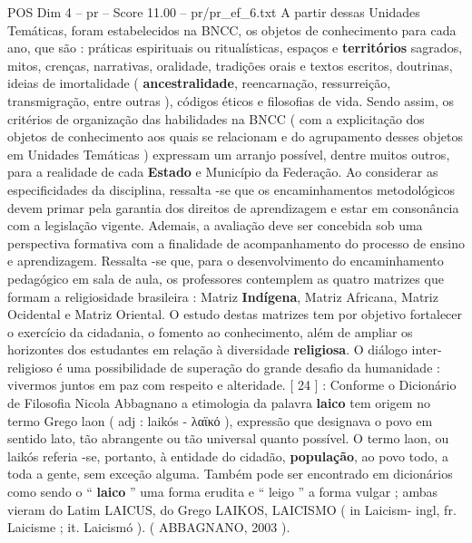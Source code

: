 \begin{textsample}{POS Dim 4 – pr – Score 11.00 – pr/pr\_ef\_6.txt}
A partir dessas Unidades Temáticas, foram estabelecidos na BNCC, os objetos de conhecimento para cada ano, que são : práticas espirituais ou ritualísticas, espaços e \textbf{territórios} sagrados, mitos, crenças, narrativas, oralidade, tradições orais e textos escritos, doutrinas, ideias de imortalidade ( \textbf{ancestralidade}, reencarnação, ressurreição, transmigração, entre outras ), códigos éticos e filosofias de vida.
Sendo assim, os critérios de organização das habilidades na BNCC ( com a explicitação dos objetos de conhecimento aos quais se relacionam e do agrupamento desses objetos em Unidades Temáticas ) expressam um arranjo possível, dentre muitos outros, para a realidade de cada \textbf{Estado} e Município da Federação.
Ao considerar as especificidades da disciplina, ressalta -se que os encaminhamentos metodológicos devem primar pela garantia dos direitos de aprendizagem e estar em consonância com a legislação vigente.
Ademais, a avaliação deve ser concebida sob uma perspectiva formativa com a finalidade de acompanhamento do processo de ensino e aprendizagem.
Ressalta -se que, para o desenvolvimento do encaminhamento pedagógico em sala de aula, os professores contemplem as quatro matrizes que formam a religiosidade brasileira : Matriz \textbf{Indígena}, Matriz Africana, Matriz Ocidental e Matriz Oriental.
O estudo destas matrizes tem por objetivo fortalecer o exercício da cidadania, o fomento ao conhecimento, além de ampliar os horizontes dos estudantes em relação à diversidade \textbf{religiosa}.
O diálogo inter-religioso é uma possibilidade de superação do grande desafio da humanidade : vivermos juntos em paz com respeito e alteridade. [ 24 ] : Conforme o Dicionário de Filosofia Nicola Abbagnano a etimologia da palavra \textbf{laico} tem origem no termo Grego laon ( adj : laikós - λαϊκό ), expressão que designava o povo em sentido lato, tão abrangente ou tão universal quanto possível.
O termo laon, ou laikós referia -se, portanto, à entidade do cidadão, \textbf{população}, ao povo todo, a toda a gente, sem exceção alguma.
Também pode ser encontrado em dicionários como sendo o “ \textbf{laico} ” uma forma erudita e “ leigo ” a forma vulgar ; ambas vieram do Latim LAICUS, do Grego LAIKOS, LAICISMO ( in Laicism- ingl, fr.
Laicisme ; it.
Laicismó ). ( ABBAGNANO, 2003 ).

\end{textsample}
